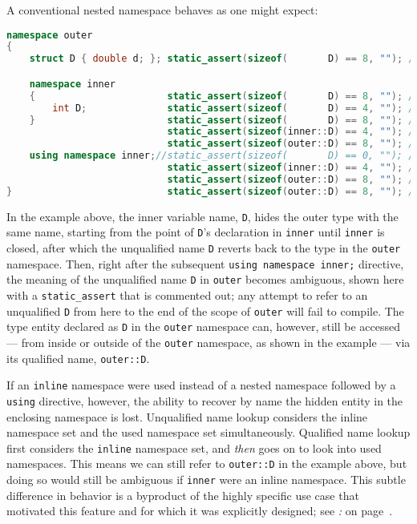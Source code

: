 \noindent A conventional nested namespace behaves as one might expect:

\begin{lstlisting}[language=C++]
namespace outer
{
    struct D { double d; }; static_assert(sizeof(       D) == 8, ""); // type

    namespace inner
    {                       static_assert(sizeof(       D) == 8, ""); // type
        int D;              static_assert(sizeof(       D) == 4, ""); // var
    }                       static_assert(sizeof(       D) == 8, ""); // type
                            static_assert(sizeof(inner::D) == 4, ""); // var
                            static_assert(sizeof(outer::D) == 8, ""); // type
    using namespace inner;//static_assert(sizeof(       D) == 0, ""); // ERROR
                            static_assert(sizeof(inner::D) == 4, ""); // var
                            static_assert(sizeof(outer::D) == 8, ""); // type
}                           static_assert(sizeof(outer::D) == 8, ""); // type
\end{lstlisting}

\noindent In the example above, the inner variable name, \texttt{D}, hides the
outer type with the same name, starting from the point of \texttt{D}'s
declaration in \texttt{inner} until \texttt{inner} is closed, after
which the unqualified name \texttt{D} reverts back to the type in the
\texttt{outer} namespace. Then, right after the subsequent
\texttt{using}~\texttt{namespace}~\texttt{inner;} directive, the meaning
of the unqualified name \texttt{D} in \texttt{outer} becomes ambiguous,
shown here with a \texttt{static\_assert} that is commented out; any
attempt to refer to an unqualified \texttt{D} from here to the end of
the scope of \texttt{outer} will fail to compile. The type entity
declared as \texttt{D} in the \texttt{outer} namespace can, however,
still be accessed --- from inside or outside of the \texttt{outer}
namespace, as shown in the example --- via its qualified name,
\texttt{outer::D}.

If an \texttt{inline} namespace were used instead of a nested namespace
followed by a \mbox{\texttt{using}} directive, however, the ability to recover
by name the hidden entity in the enclosing namespace is lost.
Unqualified name lookup considers the inline namespace set and the used
namespace set simultaneously. Qualified name lookup first considers the
\texttt{inline} namespace set, and \emph{then} goes on to look into used
namespaces. This means we can still refer to \texttt{outer::D} in the
example above, but doing so would still be ambiguous if \texttt{inner}
were an inline namespace. This subtle difference in behavior is a
byproduct of the highly specific use case that motivated this feature
and for which it was explicitly designed; see \textit{: } on page~\pageref{link-safe-abi-versioning}.

